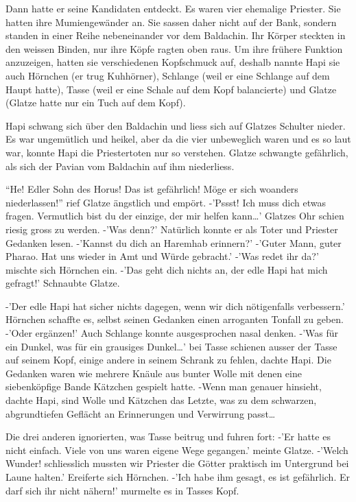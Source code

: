 \documentclass[11pt,titlepage,a5paper]{book}
\begin{document}
Dann hatte er seine Kandidaten entdeckt. Es waren vier ehemalige Priester. Sie hatten ihre Mumiengewänder an. Sie sassen daher nicht auf der Bank, sondern standen in einer Reihe nebeneinander vor dem Baldachin. Ihr Körper steckten in den weissen Binden, nur ihre Köpfe ragten oben raus. Um ihre frühere Funktion anzuzeigen, hatten sie verschiedenen Kopfschmuck auf, deshalb nannte Hapi sie auch Hörnchen (er trug Kuhhörner), Schlange (weil er eine Schlange auf dem Haupt hatte), Tasse (weil er eine Schale auf dem Kopf balancierte) und Glatze (Glatze hatte nur ein Tuch auf dem Kopf).

Hapi schwang sich über den Baldachin und liess sich auf Glatzes Schulter nieder. Es war ungemütlich und heikel, aber da die vier unbeweglich waren und es so laut war, konnte Hapi die Priestertoten nur so verstehen. Glatze schwangte gefährlich, als sich der Pavian vom Baldachin auf ihm niederliess.

"`He! Edler Sohn des Horus! Das ist gefährlich! Möge er sich woanders niederlassen!"' rief Glatze ängstlich und empört. -'Pssst! Ich muss dich etwas fragen. Vermutlich bist du der einzige, der mir helfen kann\dots' Glatzes Ohr schien riesig gross zu werden. -'Was denn?' Natürlich konnte er als Toter und Priester Gedanken lesen. -'Kannst du dich an Haremhab erinnern?' -'Guter Mann, guter Pharao. Hat uns wieder in Amt und Würde gebracht.' -'Was redet ihr da?' mischte sich Hörnchen ein. -'Das geht dich nichts an, der edle Hapi hat mich gefragt!' Schnaubte Glatze.

-'Der edle Hapi hat sicher nichts dagegen, wenn wir dich nötigenfalls verbessern.' Hörnchen schaffte es, selbst seinen Gedanken einen arroganten Tonfall zu geben. -'Oder ergänzen!' Auch Schlange konnte ausgesprochen nasal denken. -'Was für ein Dunkel, was für ein grausiges Dunkel\dots' bei Tasse schienen ausser der Tasse auf seinem Kopf, einige andere in seinem Schrank zu fehlen, dachte Hapi. Die Gedanken waren wie mehrere Knäule aus bunter Wolle mit denen eine siebenköpfige Bande Kätzchen gespielt hatte. -Wenn man genauer hinsieht, dachte Hapi, sind Wolle und Kätzchen das Letzte, was zu dem schwarzen, abgrundtiefen Geflächt an Erinnerungen und Verwirrung passt\dots

Die drei anderen ignorierten, was Tasse beitrug und fuhren fort: -'Er hatte es nicht einfach. Viele von uns waren eigene Wege gegangen.' meinte Glatze. -'Welch Wunder! schliesslich mussten wir Priester die Götter praktisch im Untergrund bei Laune halten.' Ereiferte sich Hörnchen. -'Ich habe ihm gesagt, es ist gefährlich. Er darf sich ihr nicht nähern!' murmelte es in Tasses Kopf.
\end{document}
